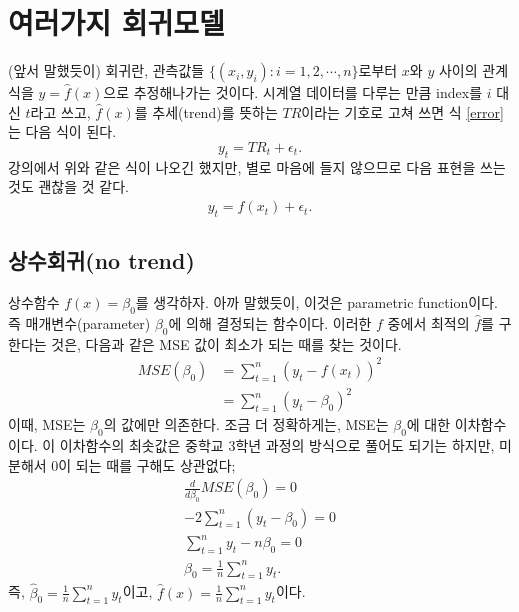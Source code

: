 \documentclass{article}
\begin{document}
\section{여러가지 회귀모델}
(앞서 말했듯이) 회귀란, 관측값들 \(\{(x_i,y_i):i=1,2,\cdots,n\}\)로부터 \(x\)와 \(y\) 사이의 관계식을 \(y=\hat f(x)\)으로 추정해나가는 것이다.
시계열 데이터를 다루는 만큼 index를 \(i\) 대신 \(t\)라고 쓰고, \(\hat f(x)\)를 추세(trend)를 뜻하는 $TR$이라는 기호로 고쳐 쓰면 식 \eqref{error}는 다음 식이 된다.
\[y_t=TR_t+\epsilon_t.\]
강의에서 위와 같은 식이 나오긴 했지만, 별로 마음에 들지 않으므로 다음 표현을 쓰는 것도 괜찮을 것 같다.
\[y_t=\hat f(x_t)+\epsilon_t.\]

\subsection{상수회귀(no trend)}
상수함수 \(f(x)=\beta_0\)를 생각하자.
아까 말했듯이, 이것은 parametric function이다.
즉 매개변수(parameter) \(\beta_0\)에 의해 결정되는 함수이다.
이러한 \(f\) 중에서 최적의 \(\hat f\)를 구한다는 것은, 다음과 같은 MSE 값이 최소가 되는 때를 찾는 것이다.
\begin{align*}
MSE(\beta_0)
& = \sum_{t=1}^n(y_t-f(x_t))^2\\
& = \sum_{t=1}^n(y_t-\beta_0)^2
\end{align*}
이때, MSE는 \(\beta_0\)의 값에만 의존한다.
조금 더 정확하게는, MSE는 \(\beta_0\)에 대한 이차함수이다.
이 이차함수의 최솟값은 중학교 3학년 과정의 방식으로 풀어도 되기는 하지만, 미분해서 0이 되는 때를 구해도 상관없다;
\begin{gather*}
\frac{d}{d\beta_0}MSE(\beta_0)=0\\
-2\sum_{t=1}^n(y_t-\beta_0)=0\\
\sum_{t=1}^ny_t-n\beta_0=0\\
\beta_0=\frac1n\sum_{t=1}^ny_t.
\end{gather*}
즉, \(\hat\beta_0=\frac1n\sum_{t=1}^ny_t\)이고, \(\hat f(x)=\frac1n\sum_{t=1}^ny_t\)이다.

\end{document}
